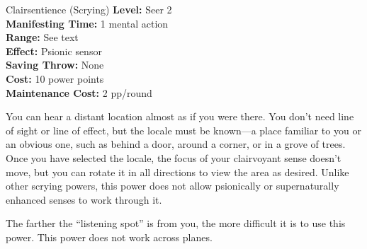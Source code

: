 {Clairsentience (Scrying)}
{
	\textbf{Level:}
	Seer 2\\
	\textbf{Manifesting Time:}
	1 mental action\\
	\textbf{Range:}
	See text\\
	\textbf{Effect:}
	Psionic sensor\\
	\textbf{Saving Throw:}
	None\\
	\textbf{Cost:}
	10 power points\\
	\textbf{Maintenance Cost:}
	2 pp/round\\
}
{
	You can hear a distant location almost as if you were there. You don’t need line of sight or line of effect, but the locale must be known---a place familiar to you or an obvious one, such as behind a door, around a corner, or in a grove of trees. Once you have selected the locale, the focus of your clairvoyant sense doesn’t move, but you can rotate it in all directions to view the area as desired. Unlike other scrying powers, this power does not allow psionically or supernaturally enhanced senses to work through it.

	The farther the ``listening spot'' is from you, the more difficult it is to use this power. This power does not work across planes.

}
